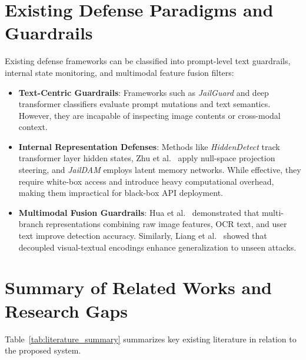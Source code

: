 \section{Existing Defense Paradigms and Guardrails}
Existing defense frameworks can be classified into prompt-level text guardrails, internal state monitoring, and multimodal feature fusion filters:
\begin{itemize}
    \item \textbf{Text-Centric Guardrails}: Frameworks such as \textit{JailGuard} \cite{Zhang2025JailGuard} and deep transformer classifiers \cite{Kushnerov2026Benchmarking} evaluate prompt mutations and text semantics. However, they are incapable of inspecting image contents or cross-modal context.
    \item \textbf{Internal Representation Defenses}: Methods like \textit{HiddenDetect} \cite{Jiang2025HiddenDetectDJ} track transformer layer hidden states, Zhu et al.~\cite{Zhu2026PrincipledSV} apply null-space projection steering, and \textit{JailDAM} \cite{Nian2025JailDAM} employs latent memory networks. While effective, they require white-box access and introduce heavy computational overhead, making them impractical for black-box API deployment.
    \item \textbf{Multimodal Fusion Guardrails}: Hua et al.~\cite{hua2026rethinking} demonstrated that multi-branch representations combining raw image features, OCR text, and user text improve detection accuracy. Similarly, Liang et al.~\cite{Liang2025LearningTD} showed that decoupled visual-textual encodings enhance generalization to unseen attacks.
\end{itemize}

\section{Summary of Related Works and Research Gaps}
Table~\ref{tab:literature_summary} summarizes key existing literature in relation to the proposed system.

